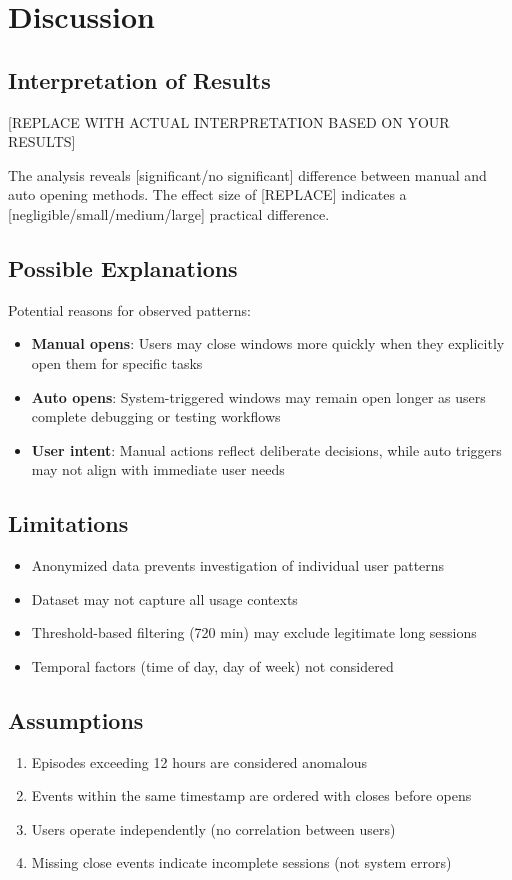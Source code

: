 \documentclass[12pt,a4paper]{article}
\begin{document}
\section{Discussion}

\subsection{Interpretation of Results}
[REPLACE WITH ACTUAL INTERPRETATION BASED ON YOUR RESULTS]

The analysis reveals [significant/no significant] difference between manual and auto opening methods. The effect size of [REPLACE] indicates a [negligible/small/medium/large] practical difference.

\subsection{Possible Explanations}
Potential reasons for observed patterns:
\begin{itemize}
    \item \textbf{Manual opens}: Users may close windows more quickly when they explicitly open them for specific tasks
    \item \textbf{Auto opens}: System-triggered windows may remain open longer as users complete debugging or testing workflows
    \item \textbf{User intent}: Manual actions reflect deliberate decisions, while auto triggers may not align with immediate user needs
\end{itemize}

\subsection{Limitations}
\begin{itemize}
    \item Anonymized data prevents investigation of individual user patterns
    \item Dataset may not capture all usage contexts
    \item Threshold-based filtering (720 min) may exclude legitimate long sessions
    \item Temporal factors (time of day, day of week) not considered
\end{itemize}

\subsection{Assumptions}
\begin{enumerate}
    \item Episodes exceeding 12 hours are considered anomalous
    \item Events within the same timestamp are ordered with closes before opens
    \item Users operate independently (no correlation between users)
    \item Missing close events indicate incomplete sessions (not system errors)
\end{enumerate}
\end{document}
